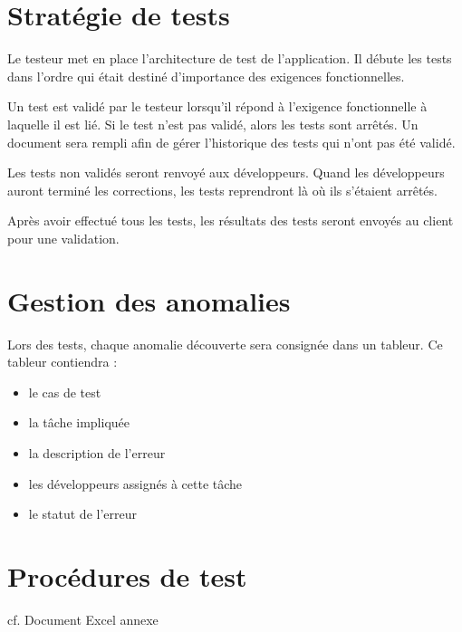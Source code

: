 \documentclass[a4paper,11pt,french]{article}
\begin{document}
\section{Stratégie de tests}
Le testeur met en place l’architecture de test de l’application. Il débute les tests dans l’ordre qui était destiné d’importance des exigences fonctionnelles. 

Un test est validé par le testeur lorsqu’il répond à l’exigence fonctionnelle à laquelle il est lié. Si le test n’est pas validé, alors les tests sont arrêtés. Un document sera rempli afin de gérer l’historique des tests qui n’ont pas été validé. 

Les tests non validés seront renvoyé aux développeurs. Quand les développeurs auront terminé les corrections, les tests reprendront là où ils s’étaient arrêtés.

Après avoir effectué tous les tests, les résultats des tests seront envoyés au client pour une validation.

\section{Gestion des anomalies}
Lors des tests, chaque anomalie découverte sera consignée dans un tableur. Ce tableur contiendra :
\begin{itemize}
\item le cas de test
\item la tâche impliquée
\item la description de l'erreur
\item les développeurs assignés à cette tâche
\item le statut de l'erreur
\end{itemize}

\section{Procédures de test}
cf. Document Excel annexe
\end{document}
